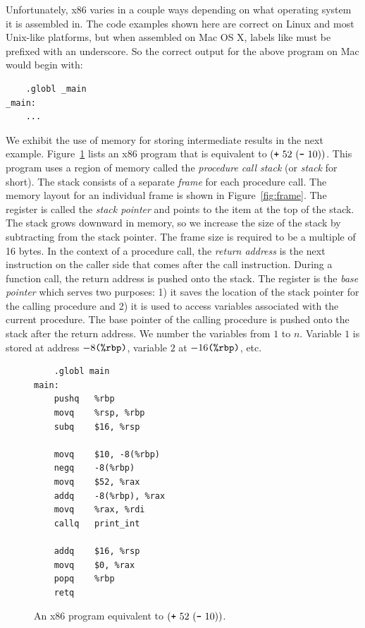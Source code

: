 \documentclass[11pt]{book}
\begin{document}
Unfortunately, x86 varies in a couple ways depending on what operating system it
is assembled in. The code examples shown here are correct on Linux and most
Unix-like platforms, but when assembled on Mac OS X, labels like  must
be prefixed with an underscore.  So the correct output for the above program on
Mac would begin with:
\begin{lstlisting}
	.globl _main
_main:
	...
\end{lstlisting}

We exhibit the use of memory for storing intermediate results in the
next example.  Figure~\ref{fig:p1-x86} lists an x86 program that is
equivalent to $(\texttt{+}~52~ (\texttt{-}~10) )$. This program uses a
region of memory called the \emph{procedure call stack} (or
\emph{stack} for short). The stack consists of a separate \emph{frame}
for each procedure call. The memory layout for an individual frame is
shown in Figure~\ref{fig:frame}.  The register  is called the
\emph{stack pointer} and points to the item at the top of the
stack. The stack grows downward in memory, so we increase the size of
the stack by subtracting from the stack pointer. The frame size is
required to be a multiple of 16 bytes. In the context of a procedure
call, the \emph{return address} is the next instruction on the caller
side that comes after the call instruction. During a function call,
the return address is pushed onto the stack.  The register 
is the \emph{base pointer} which serves two purposes: 1) it saves the
location of the stack pointer for the calling procedure and 2) it is
used to access variables associated with the current procedure.  The
base pointer of the calling procedure is pushed onto the stack after
the return address. We number the variables from $1$ to $n$. Variable
$1$ is stored at address $-8\texttt{(\%rbp)}$, variable $2$ at
$-16\texttt{(\%rbp)}$, etc.

\begin{figure}[tbp]
\begin{lstlisting}
	.globl main
main:
	pushq	%rbp
	movq	%rsp, %rbp
	subq	$16, %rsp

	movq	$10, -8(%rbp)
	negq	-8(%rbp)
	movq	$52, %rax
	addq	-8(%rbp), %rax
	movq	%rax, %rdi
	callq	print_int

	addq	$16, %rsp
	movq    $0, %rax
	popq	%rbp
	retq
\end{lstlisting}
\caption{An x86 program equivalent to $(\texttt{+}~52~(\texttt{-}~10) )$.}
\label{fig:p1-x86}
\end{figure}
\end{document}
